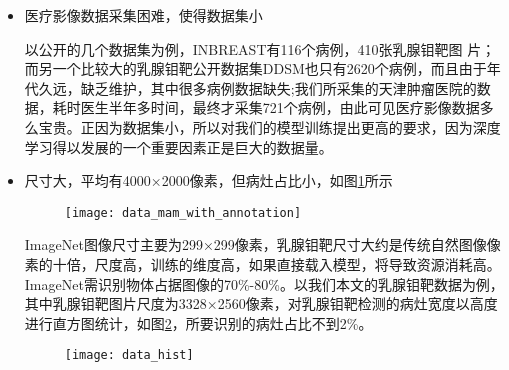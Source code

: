 \begin{itemize}
	\item 医疗影像数据采集困难，使得数据集小
	
	以公开的几个数据集为例，INBREAST\cite{27moreira2012inbreast}有116个病例，410张乳腺钼靶图
片；而另一个比较大的乳腺钼靶公开数据集DDSM\cite{21lee2018curated, 22lee2017curated,23clark2013cancer}也只有2620个病例，而且由于年代久远，缺乏维护，其中很多病例数据缺失;我们所采集的天津肿瘤医院的数据，耗时医生半年多时间，最终才采集721个病例，由此可见医疗影像数据多么宝贵。正因为数据集小，所以对我们的模型训练提出更高的要求，因为深度学习得以发展的一个重要因素正是巨大的数据量。

	\item 尺寸大，平均有4000×2000像素，但病灶占比小，如图\ref{fig:data_mam_with_annotation}所示
		\begin{figure}[!htbp]
    \centering
    \texttt{[image: data\_mam\_with\_annotation]}
    \label{fig:data_mam_with_annotation}
	\end{figure}
	
	ImageNet图像尺寸主要为299×299像素，乳腺钼靶尺寸大约是传统自然图像像素的十倍，尺度高，训练的维度高，如果直接载入模型，将导致资源消耗高。ImageNet需识别物体占据图像的70\%-80\%。以我们本文的乳腺钼靶数据为例，其中乳腺钼靶图片尺度为3328×2560像素，对乳腺钼靶检测的病灶宽度以高度进行直方图统计，如图\ref{fig:data_hist}，所要识别的病灶占比不到2\%。

\begin{comment}
\begin{figure}[htbp]
    \centering
    \begin{subfigure}[a]{0.5\textwidth}
      \texttt{[image: data\_width\_hist]}
      \caption{}
      \label{fig:data_width_hist}
    \end{subfigure}%
    \qquad
    ~%
    \begin{subfigure}[b]{0.5\textwidth}
      \texttt{[image: data\_height\_hist]}
      \caption{}
      \label{fig:data_height_hist}
    \end{subfigure}

    \bicaption{本文乳腺钼靶病灶宽高长度直方图(a) 病灶宽度直方图(b) 病灶高度直方图}{The broad and high length histogram of mammography lesions in this project (a) histogram of lesion width (b) height histogram of lesion}
    \label{fig:data_hist}
\end{figure}
\end{comment}
		\begin{figure}[!htbp]
    \centering
    \texttt{[image: data\_hist]}
    \label{fig:data_hist}
	\end{figure}
	

\end{itemize}
